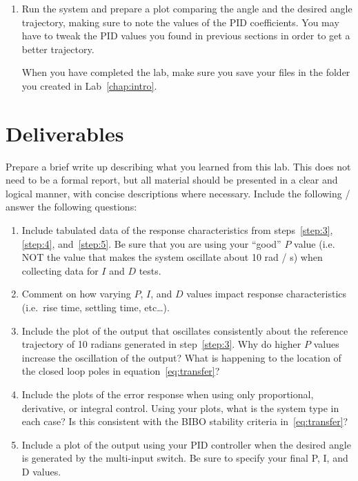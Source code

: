 \begin{enumerate}
    \item Run the system and prepare a plot comparing the angle and the desired angle
          trajectory, making sure to note the values of the PID coefficients. You may have to tweak the PID values you found in previous sections in order to get a better trajectory.

          When you have completed the lab, make sure you save your files in the folder
          you created in Lab~\ref{chap:intro}\@.

\end{enumerate}

\section{Deliverables}

Prepare a brief write up describing what you learned from this lab. This does not
need to be a formal report, but all material should be presented in a clear and logical manner,
with concise descriptions where necessary. Include the following / answer the following questions:
\begin{enumerate}
    \item Include tabulated data of the response characteristics from steps~\ref{step:3}, \ref{step:4}, and~\ref{step:5}. Be sure that you are using your ``good'' \(P\) value (i.e. NOT the value that makes the system oscillate about 10 rad / s) when collecting data for \(I\) and \(D\) tests.
    \item Comment on how varying \(P\), \(I\), and \(D\) values impact response characteristics (i.e.\ rise time, settling time, etc\ldots).
    \item Include the plot of the output that oscillates consistently about the reference trajectory of 10 radians
          generated in step~\ref{step:3}. Why do higher \(P\) values increase the oscillation of the output? What is
          happening to the location of the closed loop poles in equation~\eqref{eq:transfer}?
    \item Include the plots of the error response when using only proportional, derivative, or integral control. Using your plots, what is the system type in each case? Is this consistent with the BIBO stability criteria in~\eqref{eq:transfer}?
    \item Include a plot of the output using your PID controller when the desired angle is generated by the multi-input
          switch. Be sure to specify your final P, I, and D values.
\end{enumerate}

